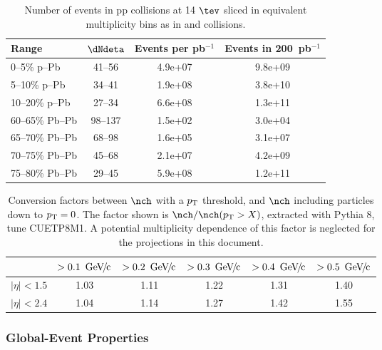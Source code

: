 \documentclass[../report.tex]{subfiles}
\begin{document}
\begin{table}
\centering
\begin{tabular}{l|c|c|c}
Range & $\dNdeta$ & Events per pb$^{-1}$ & Events in 200~pb$^{-1}$ \\
\hline
0--5\% p--Pb   & 41--56        & 4.9e+07       & 9.8e+09 \\
5--10\% p--Pb  & 34--41        & 1.9e+08       & 3.8e+10 \\
10--20\% p--Pb & 27--34        & 6.6e+08       & 1.3e+11 \\
\hline
60--65\% Pb--Pb    & 98--137       & 1.5e+02       & 3.0e+04 \\
65--70\% Pb--Pb    & 68--98        & 1.6e+05       & 3.1e+07 \\ 
70--75\% Pb--Pb    & 45--68        & 2.1e+07       & 4.2e+09 \\
75--80\% Pb--Pb    & 29--45        & 5.9e+08       & 1.2e+11 \\
\hline
\end{tabular}
\caption{Number of events in pp collisions at 14 $\tev$ sliced in equivalent multiplicity bins as in \pPb and \PbPb collisions.}
\label{tab:smallsystems_pbpb}
\end{table}

\begin{table}
\centering
\begin{tabular}{c|c|c|c|c|c}
\backslashbox{$|\eta|$}{$\pT$} & $> \unit[0.1]{\UGeVc}$ & $> \unit[0.2]{\UGeVc}$ & $> \unit[0.3]{\UGeVc}$ & $> \unit[0.4]{\UGeVc}$ & $> \unit[0.5]{\UGeVc}$ \\
\hline
$|\eta| < 1.5$ & 1.03 & 1.11 & 1.22 & 1.31 & 1.40 \\
\hline
$|\eta| < 2.4$ & 1.04 & 1.14 & 1.27 & 1.42 & 1.55 \\
\hline
\end{tabular}
\caption{Conversion factors between $\nch$ with a $\pT$ threshold, and $\nch$ including particles down to $p\sb{\scriptstyle\mathrm{T}} = 0$. The factor shown is $\nch / \nch(\pT > X)$, extracted with Pythia 8, tune CUETP8M1. A potential multiplicity dependence of this factor is neglected for the projections in this document.}
\label{tab:smallsystems_conversion}
\end{table}

\subsubsection{Global-Event Properties}
\end{document}
